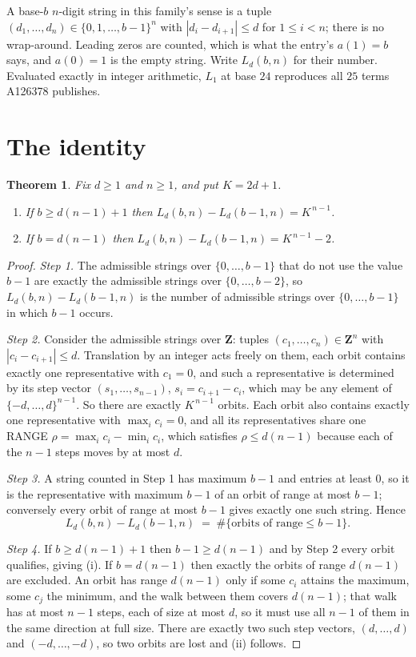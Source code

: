 \documentclass[11pt,a4paper]{article}
\theoremstyle{plain}
\newtheorem{theorem}{Theorem}
\theoremstyle{definition}
\begin{document}
A base-$b$ $n$-digit string in this family's sense is a tuple
$(d_1,\dots,d_n)\in\{0,1,\dots,b-1\}^{n}$ with $|d_i-d_{i+1}|\le d$ for $1\le i<n$; there
is no wrap-around. Leading zeros are counted, which is what the entry's $a(1)=b$ says, and
$a(0)=1$ is the empty string. Write $L_d(b,n)$ for their number. Evaluated exactly in integer
arithmetic, $L_{1}$ at base $24$ reproduces all $25$ terms A126378 publishes.

\section{The identity}

\begin{theorem}
Fix $d\ge1$ and $n\ge1$, and put $K=2d+1$.
\begin{enumerate}
\item[(i)] If $b\ge d(n-1)+1$ then $L_d(b,n)-L_d(b-1,n)=K^{\,n-1}$.
\item[(ii)] If $b=d(n-1)$ then $L_d(b,n)-L_d(b-1,n)=K^{\,n-1}-2$.
\end{enumerate}
\end{theorem}

\begin{proof}
\emph{Step 1.} The admissible strings over $\{0,\dots,b-1\}$ that do not use the value $b-1$
are exactly the admissible strings over $\{0,\dots,b-2\}$, so $L_d(b,n)-L_d(b-1,n)$ is the
number of admissible strings over $\{0,\dots,b-1\}$ in which $b-1$ occurs.

\emph{Step 2.} Consider the admissible strings over $\mathbf{Z}$: tuples
$(c_1,\dots,c_n)\in\mathbf{Z}^{n}$ with $|c_i-c_{i+1}|\le d$. Translation by an integer acts
freely on them, each orbit contains exactly one representative with $c_1=0$, and such a
representative is determined by its step vector $(s_1,\dots,s_{n-1})$, $s_i=c_{i+1}-c_i$,
which may be any element of $\{-d,\dots,d\}^{n-1}$. So there are exactly $K^{\,n-1}$ orbits.
Each orbit also contains exactly one representative with $\max_i c_i=0$, and all its
representatives share one RANGE $\rho=\max_ic_i-\min_ic_i$, which satisfies
$\rho\le d(n-1)$ because each of the $n-1$ steps moves by at most $d$.

\emph{Step 3.} A string counted in Step 1 has maximum $b-1$ and entries at least $0$, so it is
the representative with maximum $b-1$ of an orbit of range at most $b-1$; conversely every orbit
of range at most $b-1$ gives exactly one such string. Hence
\[
L_d(b,n)-L_d(b-1,n)\;=\;\#\{\text{orbits of range}\le b-1\} .
\]

\emph{Step 4.} If $b\ge d(n-1)+1$ then $b-1\ge d(n-1)$ and by Step 2 every orbit qualifies,
giving (i). If $b=d(n-1)$ then exactly the orbits of range $d(n-1)$ are excluded. An orbit has
range $d(n-1)$ only if some $c_i$ attains the maximum, some $c_j$ the minimum, and the walk
between them covers $d(n-1)$; that walk has at most $n-1$ steps, each of size at most $d$, so it
must use all $n-1$ of them in the same direction at full size. There are exactly two such step
vectors, $(d,\dots,d)$ and $(-d,\dots,-d)$, so two orbits are lost and (ii) follows.
\end{proof}
\end{document}
